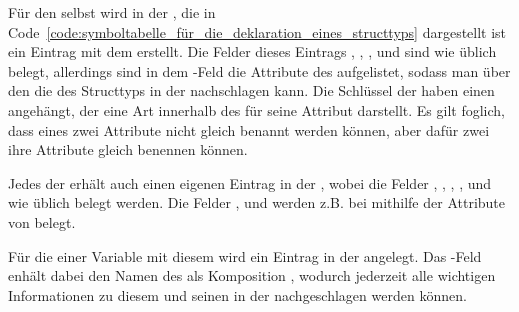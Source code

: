 Für den  selbst wird in der , die in Code~\ref{code:symboltabelle_für_die_deklaration_eines_structtyps} dargestellt ist ein Eintrag mit dem   erstellt. Die Felder dieses Eintrags , ,  ,  und  sind wie üblich belegt, allerdings sind in dem -Feld die Attribute des   aufgelistet, sodass man über den   die   des Structtyps in der   nachschlagen kann. Die Schlüssel der  haben einen   angehängt, der eine Art  innerhalb des  für seine Attribut darstellt. Es gilt foglich, dass  eines  zwei Attribute nicht gleich benannt werden können, aber dafür zwei   ihre Attribute gleich benennen können.

Jedes der   erhält auch einen eigenen Eintrag in der , wobei die Felder , ,  , ,  und  wie üblich belegt werden. Die Felder ,  und  werden z.B. bei  mithilfe der Attribute von \smalltt{Alloc(Writeable(), ArrayDecl([Num('2')], IntType('int')), Name('ar'))])} belegt.

Für die  einer Variable  mit diesem   wird ein Eintrag in der  angelegt. Das -Feld enhält dabei den Namen des  als Komposition , wodurch jederzeit alle wichtigen Informationen zu diesem  und seinen  in der   nachgeschlagen werden können.

